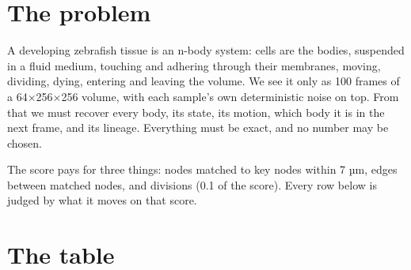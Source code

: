 \section{\texorpdfstring{The problem}{The problem}}

A developing zebrafish tissue is an n-body system: cells are the bodies, suspended in a fluid medium, touching and adhering through their membranes, moving, dividing, dying, entering and leaving the volume. We see it only as 100 frames of a 64×256×256 volume, with each sample's own deterministic noise on top. From that we must recover every body, its state, its motion, which body it is in the next frame, and its lineage. Everything must be exact, and no number may be chosen.

The score pays for three things: nodes matched to key nodes within 7 µm, edges between matched nodes, and divisions (0.1 of the score). Every row below is judged by what it moves on that score.

\section{\texorpdfstring{The table}{The table}}

